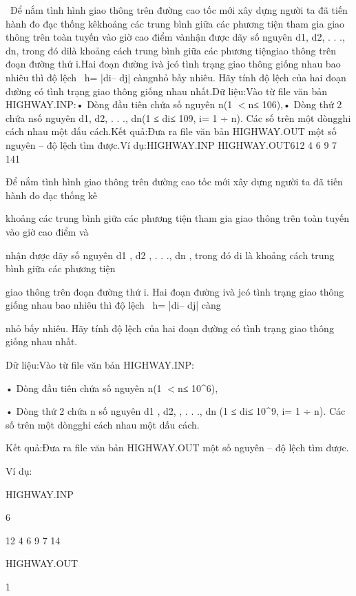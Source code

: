 

 Để nắm tình hình giao thông trên đường cao tốc mới xây dựng người ta đã tiến hành đo đạc thống kêkhoảng các trung bình giữa các phương tiện tham gia giao thông trên toàn tuyến vào giờ cao điểm vànhận được dãy số nguyên d1, d2, . . ., dn, trong đó dilà khoảng cách trung bình giữa các phương tiệngiao thông trên đoạn đường thứ i.Hai đoạn đường ivà jcó tình trạng giao thông giống nhau bao nhiêu thì độ lệch  h= |di– dj| càngnhỏ bấy nhiêu. Hãy tính độ lệch của hai đoạn đường có tình trạng giao thông giống nhau nhất.Dữ liệu:Vào từ file văn bản HIGHWAY.INP:• Dòng đầu tiên chứa số nguyên n(1 $<$n≤ 106),• Dòng thứ 2 chứa nsố nguyên d1, d2, . . ., dn(1 ≤ di≤ 109, i= 1 ÷ n). Các số trên một dòngghi cách nhau một dấu cách.Kết quả:Đưa ra file văn bản HIGHWAY.OUT một số nguyên – độ lệch tìm được.Ví dụ:HIGHWAY.INP HIGHWAY.OUT612 4 6 9 7 141

Để nắm tình hình giao thông trên đường cao tốc mới xây dựng người ta đã tiến hành đo đạc thống kê

khoảng các trung bình giữa các phương tiện tham gia giao thông trên toàn tuyến vào giờ cao điểm và

nhận được dãy số nguyên d1 , d2 , . . ., dn , trong đó di là khoảng cách trung bình giữa các phương tiện

giao thông trên đoạn đường thứ i. Hai đoạn đường ivà jcó tình trạng giao thông giống nhau bao nhiêu thì độ lệch  h= |di– dj| càng

nhỏ bấy nhiêu. Hãy tính độ lệch của hai đoạn đường có tình trạng giao thông giống nhau nhất.

Dữ liệu:Vào từ file văn bản HIGHWAY.INP:

• Dòng đầu tiên chứa số nguyên n(1 $<$n≤ 10\textasciicircum6),

• Dòng thứ 2 chứa n số nguyên d1 , d2, , . . ., dn (1 ≤ di≤ 10\textasciicircum9, i= 1 ÷ n). Các số trên một dòngghi cách nhau một dấu cách.

Kết quả:Đưa ra file văn bản HIGHWAY.OUT một số nguyên – độ lệch tìm được.

Ví dụ:

HIGHWAY.INP 

6

12 4 6 9 7 14

HIGHWAY.OUT

1

 